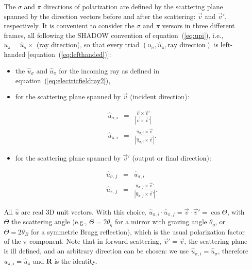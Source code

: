 \documentclass{iucr}
\begin{document}
The $\sigma$ and $\pi$ directions of polarization are defined by the scattering plane spanned by the direction vectors before and after the scattering: $\vec{v}$ and $\vec{v}'$, respectively.
It is convenient to consider the $\sigma$ and $\pi$ versors in three different frames, all following the SHADOW convention of equation~(\ref{eq:upi}), i.e., $\hat{u}_\pi = \hat{u}_\sigma \times$ (ray direction), so that every triad $(\hat{u}_\sigma, \hat{u}_\pi, \text{ray direction})$ is left-handed [equation~(\ref{eq:lefthanded})]:
\begin{itemize}
    \item the $\hat{u}_\sigma$ and $\hat{u}_\pi$ for the incoming ray as defined in equation~(\ref{eq:electricfieldray2}), 

    \item for the scattering plane spanned by $\vec{v}$ (incident direction): 

\begin{eqnarray}\label{eq:u_i}
  \hat{u}_{\sigma,i} 
  &=&
  \frac{\vec{v} \times \vec{v}'}{\left| \vec{v} \times \vec{v}' \right|}
  \nonumber \\
  \hat{u}_{\pi,i}
  &=&
  \frac{\hat{u}_{\sigma,i} \times \vec{v}}{\left| \hat{u}_{\sigma,i} \times \vec{v} \right|}.
\end{eqnarray}

    \item for the scattering plane spanned by $\vec{v}'$ (output or final direction): 

\begin{eqnarray}\label{eq:u_f}
  \hat{u}_{\sigma,f} 
  &=&
  \hat{u}_{\sigma,i} 
  \nonumber \\
  \hat{u}_{\pi,f}
  &=&
  \frac{\hat{u}_{\sigma,f} \times \vec{v}'}{\left| \hat{u}_{\sigma,f} \times \vec{v}' \right|}.
\end{eqnarray}
\end{itemize}
All $\hat{u}$ are real 3D unit vectors.
With this choice, $\hat{u}_{\pi,i}\cdot\hat{u}_{\pi,f} = \vec{v}\cdot\vec{v}' = \cos\Theta$, with $\Theta$ the scattering angle (e.g., $\Theta=2\theta_g$ for a mirror with grazing angle $\theta_g$, or $\Theta=2\theta_B$ for a symmetric Bragg reflection), which is the usual polarization factor of the $\pi$ component.
Note that in forward scattering, $\vec{v}' = \vec{v}$, the scattering plane is ill defined, and an arbitrary direction can be chosen: we use $\hat{u}_{\sigma,i}=\hat{u}_{\sigma}$, therefore $\hat{u}_{\pi,i}=\hat{u}_{\pi}$ and $\textbf{R}$ is the identity.
\end{document}
